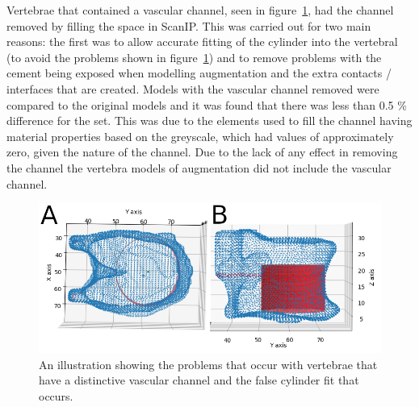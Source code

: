 Vertebrae that contained a vascular channel, seen in figure~\ref{fig:cyl_channel}, had the channel removed by filling the space in ScanIP.
This was carried out for two main reasons: the first was to allow accurate fitting of the cylinder into the vertebral (to avoid the problems shown in figure~\ref{fig:cyl_channel}) and to remove problems with the cement being exposed when modelling augmentation and the extra contacts / interfaces that are created.
Models with the vascular channel removed were compared to the original models and it was found that there was less than 0.5 \% difference for the set.
This was due to the elements used to fill the channel having material properties based on the greyscale, which had values of approximately zero, given the nature of the channel.
Due to the lack of any effect in removing the channel the vertebra models of augmentation did not include the vascular channel.

\begin{figure}[ht!]
  \centering
  \includegraphics[width=5in]{Chapters/Chapter_HT_images/cyl_fit_channel_both.png}
  \caption{An illustration showing the problems that occur with vertebrae that have a distinctive vascular channel and the false cylinder fit that occurs.}
  \label{fig:cyl_channel}
\end{figure}

